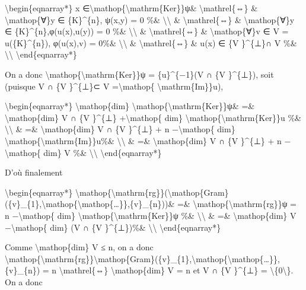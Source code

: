 \documentclass[]{article}
\begin{document}
\textbackslash{}begin\{eqnarray*\} x
∈\textbackslash{}mathop\{\textbackslash{}mathrm\{Ker\}\}ψ\&
\textbackslash{}mathrel\{⇔\} \& \textbackslash{}mathop\{∀\}y ∈
\{K\}\^{}\{n\}, ψ(x,y) = 0 \%\& \textbackslash{}\textbackslash{} \&
\textbackslash{}mathrel\{⇔\} \& \textbackslash{}mathop\{∀\}y ∈
\{K\}\^{}\{n\},φ(u(x),u(y)) = 0 \%\& \textbackslash{}\textbackslash{} \&
\textbackslash{}mathrel\{⇔\} \& \textbackslash{}mathop\{∀\}v ∈ V =
u(\{K\}\^{}\{n\}), φ(u(x),v) = 0\%\& \textbackslash{}\textbackslash{} \&
\textbackslash{}mathrel\{⇔\} \& u(x) ∈ \{V \}\^{}\{⊥\}∩ V \%\&
\textbackslash{}\textbackslash{} \textbackslash{}end\{eqnarray*\}

On a donc \textbackslash{}mathop\{\textbackslash{}mathrm\{Ker\}\}ψ =
\{u\}\^{}\{−1\}(V ∩ \{V \}\^{}\{⊥\}), soit (puisque V ∩ \{V \}\^{}\{⊥\}⊂
V =\textbackslash{}mathop\{ \textbackslash{}mathrm\{Im\}\}u),

\textbackslash{}begin\{eqnarray*\} \textbackslash{}mathop\{dim\}
\textbackslash{}mathop\{\textbackslash{}mathrm\{Ker\}\}ψ\& =\&
\textbackslash{}mathop\{dim\} V ∩ \{V \}\^{}\{⊥\}
+\textbackslash{}mathop\{ dim\}
\textbackslash{}mathop\{\textbackslash{}mathrm\{Ker\}\}u \%\&
\textbackslash{}\textbackslash{} \& =\& \textbackslash{}mathop\{dim\} V
∩ \{V \}\^{}\{⊥\} + n −\textbackslash{}mathop\{ dim\}
\textbackslash{}mathop\{\textbackslash{}mathrm\{Im\}\}u\%\&
\textbackslash{}\textbackslash{} \& =\& \textbackslash{}mathop\{dim\} V
∩ \{V \}\^{}\{⊥\} + n −\textbackslash{}mathop\{ dim\} V \%\&
\textbackslash{}\textbackslash{} \textbackslash{}end\{eqnarray*\}

D'où finalement

\textbackslash{}begin\{eqnarray*\}
\textbackslash{}mathop\{\textbackslash{}mathrm\{rg\}\}(\textbackslash{}mathop\{Gram\}(\{v\}\_\{1\},\textbackslash{}mathop\{\textbackslash{}mathop\{\ldots{}\}\},\{v\}\_\{n\}))\&
=\& \textbackslash{}mathop\{\textbackslash{}mathrm\{rg\}\}ψ = n
−\textbackslash{}mathop\{ dim\}
\textbackslash{}mathop\{\textbackslash{}mathrm\{Ker\}\}ψ \%\&
\textbackslash{}\textbackslash{} \& =\& \textbackslash{}mathop\{dim\} V
−\textbackslash{}mathop\{ dim\} (V ∩ \{V \}\^{}\{⊥\})\%\&
\textbackslash{}\textbackslash{} \textbackslash{}end\{eqnarray*\}

Comme \textbackslash{}mathop\{dim\} V ≤ n, on a donc
\textbackslash{}mathop\{\textbackslash{}mathrm\{rg\}\}\textbackslash{}mathop\{Gram\}(\{v\}\_\{1\},\textbackslash{}mathop\{\textbackslash{}mathop\{\ldots{}\}\},\{v\}\_\{n\})
= n \textbackslash{}mathrel\{⇔\} \textbackslash{}mathop\{dim\} V = n et
V ∩ \{V \}\^{}\{⊥\} = \textbackslash{}\{0\textbackslash{}\}. On a donc
\end{document}
